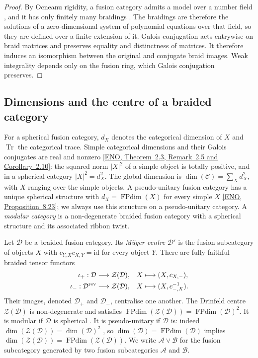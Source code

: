 \documentclass[11pt,oneside]{amsart}
\theoremstyle{remark}
\newcommand{\C}{\mathcal C}
\newcommand{\D}{\mathcal D}
\newcommand{\FP}{\operatorname{FPdim}}
\newcommand{\Tr}{\operatorname{Tr}}
\newcommand{\sourcecite}[3]{\nocite{#1}\href{#3}{[#1, #2]}}
\begin{document}
\begin{proof}
By Ocneanu rigidity, a fusion category admits a model over a number field
\cite[Theorem~2.30]{ENO}, and it has only finitely many braidings
\cite[Remark~2.33]{ENO}. The braidings are therefore the solutions of a
zero-dimensional system of polynomial equations over that field, so they are
defined over a finite extension of it. Galois conjugation acts entrywise on braid matrices and preserves
equality and distinctness of matrices. It therefore induces an isomorphism
between the original and conjugate braid images. Weak integrality depends
only on the fusion ring, which Galois conjugation preserves.
\end{proof}

\subsection{Dimensions and the centre of a braided category}

For a spherical fusion category, $d_X$ denotes the categorical dimension of
$X$ and $\Tr$ the categorical trace. Simple categorical dimensions and their
Galois conjugates are real and nonzero
\sourcecite{ENO}{Theorem~2.3, Remark~2.5 and Corollary~2.10}{https://annals.math.princeton.edu/wp-content/uploads/annals-v162-n2-p01.pdf\#page=5}:
the squared norm $|X|^2$ of a simple object is totally positive, and in a
spherical category $|X|^2=d_X^2$. The global dimension is $\dim(\C)=\sum_Xd_X^2$, with $X$ ranging over the
simple objects. A pseudo-unitary fusion category has a unique spherical
structure with $d_X=\FP(X)$ for every simple $X$
\sourcecite{ENO}{Proposition~8.23}{https://annals.math.princeton.edu/wp-content/uploads/annals-v162-n2-p01.pdf\#page=42};
we always use this structure on a pseudo-unitary category. A \emph{modular
category} is a non-degenerate braided fusion category with a spherical
structure and its associated ribbon twist.

Let $\D$ be a braided fusion category. Its \emph{M\"uger centre} $\D'$ is the
fusion subcategory of objects $X$ with $c_{Y,X}c_{X,Y}=\mathrm{id}$ for every
object $Y$. There are fully faithful braided tensor
functors
\[
\begin{aligned}
\iota_+:\D&\longrightarrow\mathcal Z(\D),
&X&\longmapsto(X,c_{X,-}),\\
\iota_-:\D^{\rm rev}&\longrightarrow\mathcal Z(\D),
&X&\longmapsto(X,c^{-1}_{-,X}).
\end{aligned}
\]
Their images, denoted $\D_+$ and $\D_-$, centralise one another. The Drinfeld
centre $\mathcal Z(\D)$ is non-degenerate and satisfies
$\FP(\mathcal Z(\D))=\FP(\D)^2$. It is modular if $\D$ is spherical
\cite[Theorem~7.16.6 and Corollaries~8.20.13 and~8.20.14]{EGNO}. It is
pseudo-unitary if $\D$ is: indeed $\dim(\mathcal Z(\D))=\dim(\D)^2$
\cite[Proposition~9.3.4]{EGNO}, so $\dim(\D)=\FP(\D)$ implies
$\dim(\mathcal Z(\D))=\FP(\mathcal Z(\D))$. We write
$\mathcal A\vee\mathcal B$ for the fusion subcategory generated by two fusion
subcategories $\mathcal A$ and $\mathcal B$.
\end{document}
